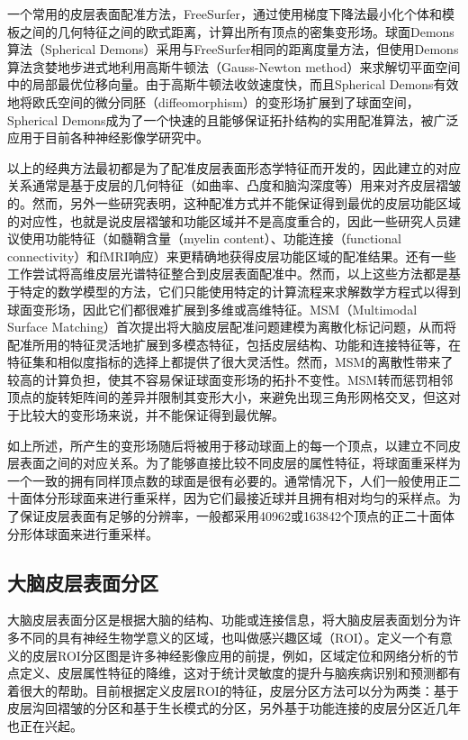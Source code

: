 一个常用的皮层表面配准方法，FreeSurfer\cite{fischl1999high}，通过使用梯度下降法最小化个体和模板之间的几何特征之间的欧式距离，计算出所有顶点的密集变形场。球面Demons算法（Spherical Demons）\cite{yeo2009spherical}采用与FreeSurfer相同的距离度量方法，但使用Demons算法\cite{vercauteren2009diffeomorphic}贪婪地步进式地利用高斯牛顿法（Gauss-Newton method）来求解切平面空间中的局部最优位移向量。由于高斯牛顿法收敛速度快，而且Spherical Demons有效地将欧氏空间的微分同胚（diffeomorphism）的变形场扩展到了球面空间，Spherical Demons成为了一个快速的且能够保证拓扑结构的实用配准算法，被广泛应用于目前各种神经影像学研究中。

以上的经典方法\cite{yeo2009spherical,fischl1999high,lyu2019hierarchical}最初都是为了配准皮层表面形态学特征而开发的，因此建立的对应关系通常是基于皮层的几何特征（如曲率、凸度和脑沟深度等）用来对齐皮层褶皱的。然而，另外一些研究表明\cite{robinson2014msm,coalson2018impact,glasser2016multi}，这种配准方式并不能保证得到最优的皮层功能区域的对应性，也就是说皮层褶皱和功能区域并不是高度重合的，因此一些研究人员建议使用功能特征（如髓鞘含量（myelin content）、功能连接（functional connectivity）\cite{conroy2013inter}和fMRI响应\cite{robinson2014msm}）来更精确地获得皮层功能区域的配准结果。还有一些工作尝试将高维皮层光谱特征\cite{lombaert2013diffeomorphic}整合到皮层表面配准中。然而，以上这些方法都是基于特定的数学模型的方法，它们只能使用特定的计算流程来求解数学方程式以得到球面变形场，因此它们都很难扩展到多维或高维特征。MSM（Multimodal Surface Matching）\cite{robinson2014msm}首次提出将大脑皮层配准问题建模为离散化标记问题，从而将配准所用的特征灵活地扩展到多模态特征，包括皮层结构、功能和连接特征等，在特征集和相似度指标的选择上都提供了很大灵活性。然而，MSM的离散性带来了较高的计算负担，使其不容易保证球面变形场的拓扑不变性。MSM转而惩罚相邻顶点的旋转矩阵间的差异并限制其变形大小，来避免出现三角形网格交叉，但这对于比较大的变形场来说，并不能保证得到最优解。

如上所述，所产生的变形场随后将被用于移动球面上的每一个顶点，以建立不同皮层表面之间的对应关系。为了能够直接比较不同皮层的属性特征，将球面重采样为一个一致的拥有同样顶点数的球面是很有必要的。通常情况下，人们一般使用正二十面体分形球面来进行重采样，因为它们最接近球并且拥有相对均匀的采样点\cite{fischl2012freesurfer}。为了保证皮层表面有足够的分辨率，一般都采用40962或163842个顶点的正二十面体分形体球面来进行重采样。


\subsection{大脑皮层表面分区}
大脑皮层表面分区\cite{desikan2006automated}是根据大脑的结构、功能或连接信息，将大脑皮层表面划分为许多不同的具有神经生物学意义的区域，也叫做感兴趣区域（ROI）。定义一个有意义的皮层ROI分区图是许多神经影像应用的前提，例如，区域定位和网络分析的节点定义、皮层属性特征的降维，这对于统计灵敏度的提升与脑疾病识别和预测都有着很大的帮助。目前根据定义皮层ROI的特征，皮层分区方法可以分为两类：基于皮层沟回褶皱的分区\cite{destrieux2010automatic}和基于生长模式的分区\cite{xia2019fetal}，另外基于功能连接的皮层分区近几年也正在兴起\cite{schaefer2018local}。

